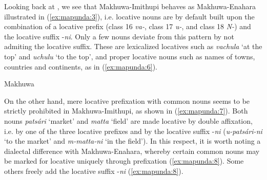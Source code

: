 \documentclass[output=paper ]{langscibook}
\begin{document}
Looking back at , we see that Makhuwa-Imithupi behaves as Makhuwa-Enahara illustrated in (\ref{ex:mapunda:3}), i.e. locative nouns are by default built upon the combination of a locative prefix (class 16 \textit{va-}, class 17 \textit{u-}, and class 18 \textit{{N-}}) and the locative suffix -\textit{ni}. Only a few nouns deviate from this pattern by not admiting the locative suffix. These are lexicalized locatives such as \textit{vachula} ‘at the top’ and \textit{uchulu} ‘to the top’, and proper locative nouns such as names of towns, countries and continents, as in (\ref{ex:mapunda:6}). 


\ea 
\label{ex:mapunda:6}Makhuwa
    \ea\label{ex:mapunda:6a}
        \z
    \ex\label{ex:mapunda:6b}  
        \z
    \z
\z  

On the other hand, mere locative prefixation with common nouns seems to be strictly prohibited in Makhuwa-Imithupi, as shown in (\ref{ex:mapunda:7}). Both nouns \textit{patsári} ‘market’ and \textit{matta} ‘field’ are made locative by double affixation, i.e. by one of the three locative prefixes and by the locative suffix -\textit{ni} (\textit{u-patsári-ni} ‘to the market’ and \textit{m-matta-ni} ‘in the field’). In this respect, it is worth noting a dialectal difference with Makhuwa-Enahara, whereby certain common nouns may be marked for locative uniquely through prefixation (\ref{ex:mapunda:8}). Some others freely add the locative suffix -\textit{ni} (\ref{ex:mapunda:8}).  
\end{document}
